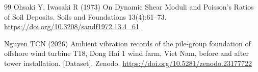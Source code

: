 \documentclass[11pt]{article}
\begin{document}
\begin{thebibliography}{99}
Ohsaki Y, Iwasaki R (1973) On Dynamic Shear Moduli and Poisson's Ratios of Soil Deposits. Soils and Foundations 13(4):61--73. \url{https://doi.org/10.3208/sandf1972.13.4_61}

Nguyen TCN (2026) Ambient vibration records of the pile-group foundation of offshore wind turbine T18, Dong Hai 1 wind farm, Viet Nam, before and after tower installation. [Dataset]. Zenodo. \url{https://doi.org/10.5281/zenodo.23177722}

\end{thebibliography}
\end{document}

